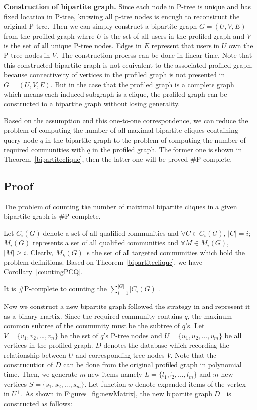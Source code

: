 {\bf Construction of bipartite graph.}
Since each node in P-tree is unique and has fixed location in P-tree, knowing all p-tree nodes is enough to reconstruct the original P-tree. Then we can simply construct a bipartite graph $G=(U,V,E)$ from the profiled graph where $U$ is the set of all users in the profiled graph and $V$ is the set of all unique P-tree nodes. Edges in $E$ represent that users in $U$ own the P-tree nodes in $V$. The construction process can be done in linear time. Note that this constructed bipartite graph is not equivalent to the associated profiled graph, because connectiveity of vertices in the profiled graph is not presented in $G=(U,V,E)$. But in the case that the profiled graph is a complete graph which means each induced subgraph is a clique, the profiled graph can be constructed to a bipartite graph without losing generality. 

Based on the assumption and this one-to-one correspondence, we can reduce the problem of computing the number of all maximal bipartite cliques containing query node $q$ in the bipartite graph to the problem of computing the number of required communities with $q$ in the profiled graph. The former one is shown in Theorem~\ref{bipartiteclique}, then the latter one will be proved $\#$P-complete.

\subsection{Proof}
 \begin{theorem}
\label{bipartiteclique}
The problem of counting the number of maiximal bipartite cliques in a given bipartite graph is $\#$P-complete.
\end{theorem}

Let $C_i(G)$ denote a set of all qualified communities and $\forall C \in C_i(G)$, $|C|=i$; $M_i(G)$ represents a set of all qualified communities and $\forall M \in M_i(G)$, $|M|\geq i$. Clearly, $M_k(G)$ is the set of all targeted communities which hold the problem definitions.
Based on Theorem~\ref{bipartiteclique}, we have Corollary~\ref{countingPCQ}. 

\begin{corollary}
\label{countingPCQ}
It is $\#$P-complete to counting the $\sum_{i=1}^{|G|}{|C_i(G)|}$.
\end{corollary}

Now we construct a new bipartite graph followed the strategy in \cite{yang2004complexity} and represent it as a binary martix. 
Since the required community contains $q$, the maxinum common subtree of the community must be the subtree of $q$'s. Let $V=\{v_1,v_2,...,v_n\}$ be the set of $q$'s P-tree nodes and $U=\{u_1,u_2,...,u_m\}$ be all vertices in the profiled graph. $D$ denotes the database which recording the relationship between $U$ and corresponding tree nodes $V$. Note that the construcution of $D$ can be done from the original profiled graph in polynomial time. Then, we generate $m$ new items namely $L=\{l_1,l_2,...,l_m\}$ and $m$ new vertices $S=\{s_1,s_2,...,s_m\}$. Let function $w$ denote expanded items of the vertex in $U^+$. As shown in Figures~\ref{fig:newMatrix}, the new bipartite graph $D^+$ is constructed as follows: 

